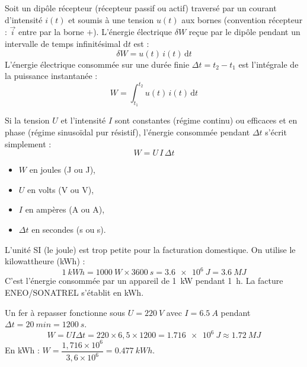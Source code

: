 \documentclass[11pt]{article}
\newcommand{\cle}[1]{{\popxbold\color{popdark}#1}}
\begin{document}
\begin{definition}
Soit un dipôle récepteur (récepteur passif ou actif) traversé par un courant d'intensité $i(t)$ et soumis à une tension $u(t)$ aux bornes (convention récepteur : $\vec{i}$ entre par la borne $+$). L'énergie électrique $\delta W$ reçue par le dipôle pendant un intervalle de temps infinitésimal $\mathrm{d}t$ est :
\[
\delta W = u(t)\,i(t)\,\mathrm{d}t
\]
L'énergie électrique consommée sur une durée finie $\Delta t = t_2 - t_1$ est l'intégrale de la puissance instantanée :
\[
W = \int_{t_1}^{t_2} u(t)\,i(t)\,\mathrm{d}t
\]
\end{definition}

\begin{propriete}
Si la tension $U$ et l'intensité $I$ sont constantes (régime continu) ou efficaces et en phase (régime sinusoïdal pur résistif), l'énergie consommée pendant $\Delta t$ s'écrit simplement :
\[
\boxed{W = U\,I\,\Delta t}
\]
\begin{itemize}
\item $W$ en joules (\si{\joule} ou \si{J}),
\item $U$ en volts (\si{\volt} ou \si{V}),
\item $I$ en ampères (\si{\ampere} ou \si{A}),
\item $\Delta t$ en secondes (\si{\second} ou \si{s}).
\end{itemize}
\end{propriete}

\begin{aretenir}
L'unité SI (le joule) est trop petite pour la facturation domestique. On utilise le \cle{kilowattheure} (\si{\kWh}) :
\[
\SI{1}{kWh} = \SI{1000}{W} \times \SI{3600}{s} = \SI{3,6e6}{J} = \SI{3,6}{MJ}
\]
C'est l'énergie consommée par un appareil de \SI{1}{kW} pendant \SI{1}{h}. La facture ENEO/SONATREL s'établit en kWh.
\end{aretenir}

\begin{exemplebox}
Un fer à repasser fonctionne sous $U = \SI{220}{V}$ avec $I = \SI{6,5}{A}$ pendant $\Delta t = \SI{20}{min} = \SI{1200}{s}$.
\[
W = U I \Delta t = 220 \times 6,5 \times 1200 = \SI{1,716e6}{J} \approx \SI{1,72}{MJ}
\]
En kWh : $W = \dfrac{1,716 \times 10^6}{3,6 \times 10^6} = \SI{0,477}{kWh}$.
\end{exemplebox}
\end{document}

